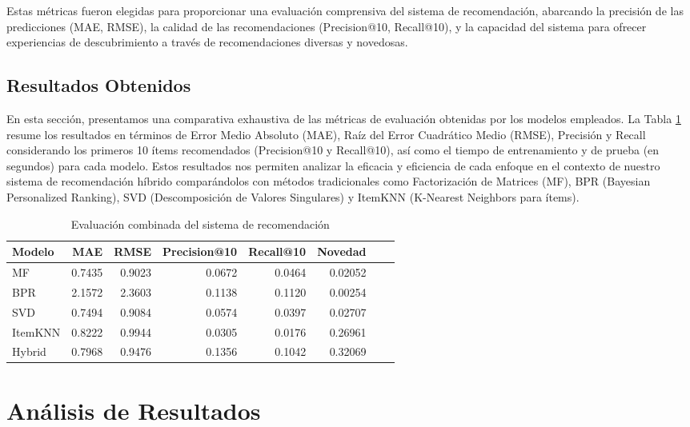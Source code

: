 \documentclass[runningheads]{llncs}
\begin{document}
Estas métricas fueron elegidas para proporcionar una evaluación comprensiva del sistema de recomendación, abarcando la precisión de las predicciones (MAE, RMSE), la calidad de las recomendaciones (Precision@10, Recall@10), y la capacidad del sistema para ofrecer experiencias de descubrimiento a través de recomendaciones diversas y novedosas.




        \subsection{Resultados Obtenidos}

        En esta sección, presentamos una comparativa exhaustiva de las métricas de evaluación obtenidas por los modelos empleados. La Tabla \ref{tab:metrics} resume los resultados en términos de Error Medio Absoluto (MAE), Raíz del Error Cuadrático Medio (RMSE), Precisión y Recall considerando los primeros 10 ítems recomendados (Precision@10 y Recall@10), así como el tiempo de entrenamiento y de prueba (en segundos) para cada modelo. Estos resultados nos permiten analizar la eficacia y eficiencia de cada enfoque en el contexto de nuestro sistema de recomendación híbrido comparándolos con métodos tradicionales como Factorización de Matrices (MF), BPR (Bayesian Personalized Ranking), SVD (Descomposición de Valores Singulares) y ItemKNN (K-Nearest Neighbors para ítems).
    \begin{table}[h]
        \centering
        \caption{Evaluación combinada del sistema de recomendación}
        \label{tab:metrics}
        \begin{tabular}{lrrrrrrr}
        \hline
        \textbf{Modelo} & \textbf{MAE} & \textbf{RMSE} & \textbf{Precision@10} & \textbf{Recall@10} & \textbf{Novedad} \\ \hline
        MF      & 0.7435 & 0.9023 & 0.0672 & 0.0464  & 0.02052 \\
        BPR     & 2.1572 & 2.3603 & 0.1138 & 0.1120 & 0.00254 \\
        SVD     & 0.7494 & 0.9084 & 0.0574 & 0.0397 & 0.02707 \\
        ItemKNN & 0.8222 & 0.9944 & 0.0305 & 0.0176 & 0.26961 \\
        Hybrid  & 0.7968 & 0.9476 & 0.1356 & 0.1042 & 0.32069 \\ \hline
        \end{tabular}
    \end{table}
    \section{Análisis de Resultados}
\end{document}
